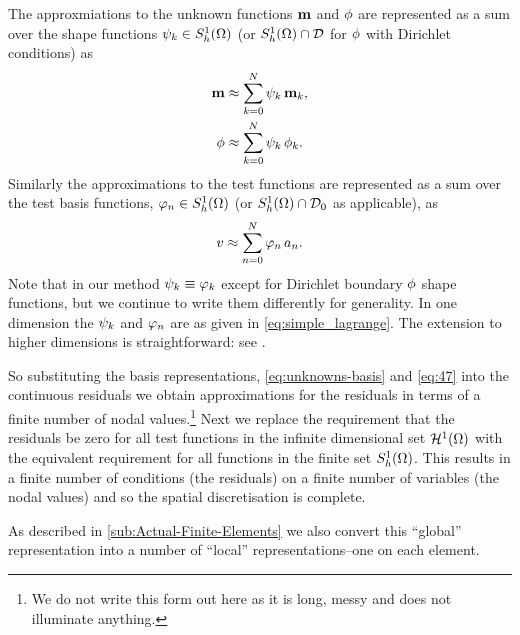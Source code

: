The approxmiations to the unknown functions $\mathbf{m}$ and $\phi$ are represented as a sum over the shape functions ${\psi_k} \in {S_h^1(\Omega)}$ (or ${S_h^1(\Omega)} \cap \mathcal{D}$ for $\phi$ with Dirichlet conditions) as
\begin{equation}
  \begin{aligned}
    \mathbf{m} &\approx \sum_{k = 0}^{N} {\psi_k} \, \mathbf{m}_k, \\
    \phi &\approx \sum_{k = 0}^{N} {\psi_k} \, \phi_{k}.
    \label{eq:unknowns-basis}
  \end{aligned}
\end{equation}
Similarly the approximations to the test functions are represented as a sum over the test basis functions, ${\varphi_n} \in {S_h^1(\Omega)}$ (or ${S_h^1(\Omega)} \cap \mathcal{D}_0$ as applicable), as
\begin{equation}
  \label{eq:47}
  v \approx \sum_{n = 0}^{N} {\varphi_n} \, a_n.
\end{equation}
Note that in our method $\psi_k \equiv \varphi_k$ except for Dirichlet boundary $\phi$ shape functions, but we continue to write them differently for generality.
In one dimension the ${\psi_k}$ and ${\varphi_n}$ are as given in \eqref{eq:simple_lagrange}.
The extension to higher dimensions is straightforward: see \eg \cite[25]{HowardElmanDavidSilvester2006}.

So substituting the basis representations, \eqref{eq:unknowns-basis} and \eqref{eq:47} into the continuous residuals we obtain approximations for the residuals in terms of a finite number of nodal values.\footnote{We do not write this form out here as it is long, messy and does not illuminate anything.}
Next we replace the requirement that the residuals be zero for all test functions in the infinite dimensional set ${\mathcal{H}^1(\Omega)}$ with the equivalent requirement for all functions in the finite set ${S_h^1(\Omega)}$. 
This results in a finite number of conditions (the residuals) on a finite number of variables (the nodal values) and so the spatial discretisation is complete.

As described in \autoref{sub:Actual-Finite-Elements} we also convert this ``global'' representation into a number of ``local'' representations--one on each element.



